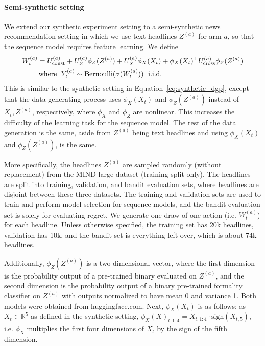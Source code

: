\paragraph{Semi-synthetic setting}
We extend our synthetic experiment setting to a semi-synthetic news recommendation setting in which we use text headlines $Z^{(a)}$ for arm $a$, so that the sequence model requires feature learning. 
We define\begin{align}
\label{eq:semisynthetic_dgp}
&W^{(a)}_t = U^{(a)}_{\rm const} + U^{(a)}_{Z} \phi_Z (Z^{(a)})+U^{(a)}_{X} \phi_X( X_t) + \phi_X (X_t)^\top U^{(a)}_{\rm cross} \phi_Z( Z^{(a)})\nonumber\\
&\quad\quad\textrm{ where }\;Y^{(a)}_t\sim \textrm{Bernoulli}(\sigma(W^{(a)}_t)) \; \textrm{ i.i.d.}
\end{align}
This is similar to the synthetic setting in Equation~\eqref{eq:synthetic_dgp}, except that the data-generating process uses $\phi_X(X_t)$ and $\phi_Z(Z^{(a)})$ instead of $X_t,Z^{(a)}$, respectively, where $\phi_X$ and $\phi_Z$ are nonlinear. This increases the difficulty of the learning task for the sequence model. The rest of the data generation is the same, aside from $Z^{(a)}$ being text headlines and using $\phi_X(X_t)$ and $\phi_Z(Z^{(a)})$, is the same. 

More specifically, the headlines $Z^{(a)}$ are sampled randomly (without replacement) from the MIND large dataset  \cite{wu2020mind} (training split only). The headlines are split into training, validation, and bandit evaluation sets, where headlines are disjoint between these three datasets. The training and validation sets are used to train and perform model selection for sequence models, and the bandit evaluation set is solely for evaluating regret. We generate one draw of one action (i.e. $W_t^{(a)}$) for each headline.  Unless otherwise specified, the training set has 20k headlines, validation has 10k, and the bandit set is everything left over, which is about 74k headlines. 

Additionally, $\phi_Z( Z^{(a)})$ is a two-dimensional vector, where the first dimension is the probability output of a pre-trained binary \cite{hfsentiment} evaluated on $Z^{(a)}$, and the second dimension is the probability output of 
a binary pre-trained formality classifier on $Z^{(a)}$ \cite{hfformality} with outputs normalized to have mean 0 and variance 1. Both models were obtained from huggingface.com.
Next, $\phi_X(X_t)$ is as follows: as $X_t\in \mathbb R^5$ as defined in the synthetic setting, $\phi_X(X)_{t,1:4}= X_{t,1:4}\cdot  \textrm{sign}(X_{t,5})$, i.e. $\phi_X$ multiplies the first four dimensions of $X_t$ by the sign of the fifth dimension. 


